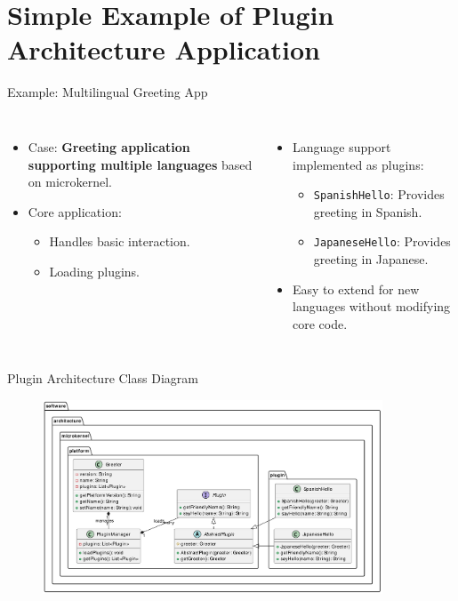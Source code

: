 \documentclass[aspectratio=169, table]{beamer}
\begin{document}
\section{Simple Example of Plugin Architecture Application}


\begin{frame}{Example: Multilingual Greeting App}
\vspace{20pt}
\begin{columns}
\begin{itemize}
	\item Case: \textbf{Greeting application supporting multiple languages} based on microkernel.
	\item Core application:
	\begin{itemize}
		\item Handles basic interaction.
		\item Loading plugins.
	\end{itemize}
\end{itemize}
\begin{itemize}
	\item Language support implemented as plugins:
	\begin{itemize}
		\item \texttt{SpanishHello}: Provides greeting in Spanish.
		\item \texttt{JapaneseHello}: Provides greeting in Japanese.
	\end{itemize}
	\item Easy to extend for new languages without modifying core code.
\end{itemize}
\end{columns}
\end{frame}

\begin{frame}{Plugin Architecture Class Diagram}
\vspace{20pt}
\begin{figure}
\centering
\includegraphics[width=0.9\textwidth]{../../images/out/plugin_architecture}
\label{fig:plugin_architecture}
\end{figure}
\end{frame}
\end{document}

